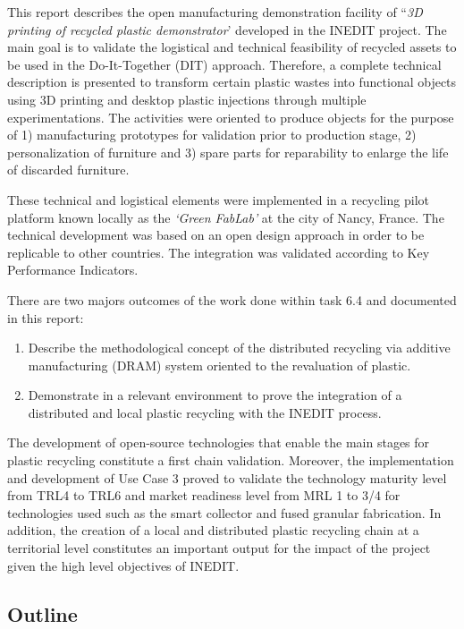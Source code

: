 \documentclass[
  11pt,
]{article}
\providecommand{\tightlist}{%
  \setlength{\itemsep}{0pt}\setlength{\parskip}{0pt}}\usepackage{longtable,booktabs,array}
\begin{document}
This report describes the open manufacturing demonstration facility of
``\emph{3D printing of recycled plastic demonstrator}' developed in the
INEDIT project. The main goal is to validate the logistical and
technical feasibility of recycled assets to be used in the
Do-It-Together (DIT) approach. Therefore, a complete technical
description is presented to transform certain plastic wastes into
functional objects using 3D printing and desktop plastic injections
through multiple experimentations. The activities were oriented to
produce objects for the purpose of 1) manufacturing prototypes for
validation prior to production stage, 2) personalization of furniture
and 3) spare parts for reparability to enlarge the life of discarded
furniture.

These technical and logistical elements were implemented in a recycling
pilot platform known locally as the \emph{`Green FabLab'} at the city of
Nancy, France. The technical development was based on an open design
approach in order to be replicable to other countries. The integration
was validated according to Key Performance Indicators.

There are two majors outcomes of the work done within task 6.4 and
documented in this report:

\begin{enumerate}
\def\labelenumi{\arabic{enumi}.}
\tightlist
\item
  Describe the methodological concept of the distributed recycling via
  additive manufacturing (DRAM) system oriented to the revaluation of
  plastic.
\item
  Demonstrate in a relevant environment to prove the integration of a
  distributed and local plastic recycling with the INEDIT process.
\end{enumerate}

The development of open-source technologies that enable the main stages
for plastic recycling constitute a first chain validation. Moreover, the
implementation and development of Use Case 3 proved to validate the
technology maturity level from TRL4 to TRL6 and market readiness level
from MRL 1 to 3/4 for technologies used such as the smart collector and
fused granular fabrication. In addition, the creation of a local and
distributed plastic recycling chain at a territorial level constitutes
an important output for the impact of the project given the high level
objectives of INEDIT.

\hypertarget{outline}{%
\subsection{Outline}\label{outline}}
\end{document}
